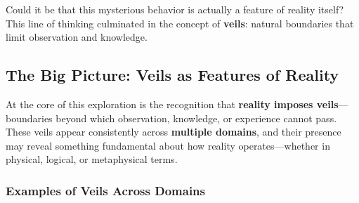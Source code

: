 \documentclass[12pt]{article}
\begin{document}
Could it be that this mysterious behavior is actually a feature of reality itself? This line of thinking culminated in the concept of \textbf{veils}: natural boundaries that limit observation and knowledge.

\subsection{The Big Picture: Veils as Features of Reality}

At the core of this exploration is the recognition that \textbf{reality imposes veils}—boundaries beyond which observation, knowledge, or experience cannot pass. These veils appear consistently across \textbf{multiple domains}, and their presence may reveal something fundamental about how reality operates—whether in physical, logical, or metaphysical terms.

\subsubsection{Examples of Veils Across Domains}
\end{document}
